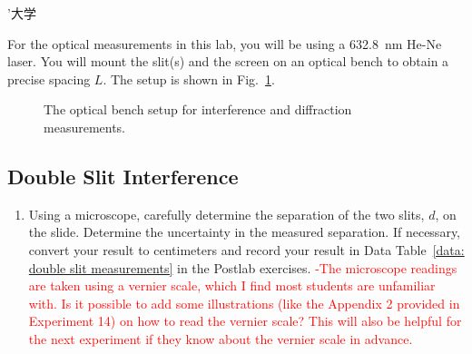 ’大学\documentclass[addpoints]{physlabs}
\begin{document}
\begin{labsection}
\begin{theory}
\end{theory}

\begin{experiment}

    For the optical measurements in this lab, you will be using a \qty{632.8}{\nano\meter} He-Ne laser. You will mount the slit(s) and the screen on an optical bench to obtain a precise spacing $L$. The setup is shown in Fig.~\ref{fig: interference bench}.

    \begin{figure}[ht]
        \centering
        
        \caption{The optical bench setup for interference and diffraction measurements.}
        \label{fig: interference bench}
    \end{figure}

    \begin{center}
    \setlength{\fboxsep}{6pt}%
    \setlength{\fboxrule}{2pt}%
    \end{center}

    \subsection*{Double Slit Interference}

    \begin{enumerate}
        \item Using a microscope, carefully determine the separation of the two slits, $d$, on the slide. Determine the uncertainty in the measured separation. If necessary, convert your result to centimeters and record your result in Data Table~\ref{data: double slit measurements} in the Postlab exercises.
        \textcolor{red}{-The microscope readings are taken using a vernier scale, which I find most students are unfamiliar with. Is it possible to add some illustrations (like the Appendix 2 provided in Experiment 14) on how to read the vernier scale? This will also be helpful for the next experiment if they know about the vernier scale in advance.}


\end{enumerate}
\end{experiment}
\end{labsection}
\end{document}

